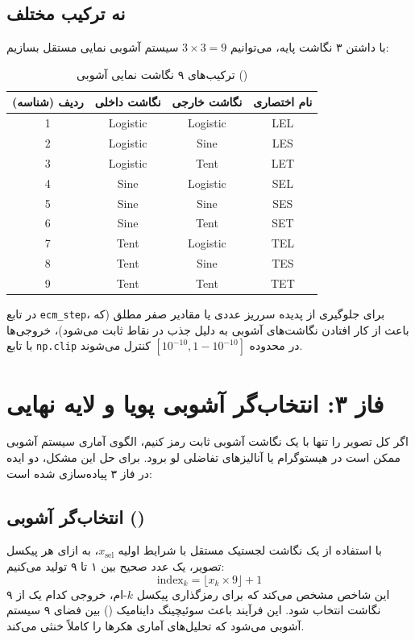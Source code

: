 \subsection{نه ترکیب مختلف}
با داشتن ۳ نگاشت پایه، می‌توانیم $3 \times 3 = 9$ سیستم آشوبی نمایی مستقل بسازیم:
\begin{table}[h!]
\centering
\begin{latin}
\begin{tabular}{|c|c|c|c|}
\hline
\textbf{ردیف (شناسه)} & \textbf{نگاشت داخلی} & \textbf{نگاشت خارجی} & \textbf{نام اختصاری} \\ \hline
1 & Logistic & Logistic & LEL \\ \hline
2 & Logistic & Sine & LES \\ \hline
3 & Logistic & Tent & LET \\ \hline
4 & Sine & Logistic & SEL \\ \hline
5 & Sine & Sine & SES \\ \hline
6 & Sine & Tent & SET \\ \hline
7 & Tent & Logistic & TEL \\ \hline
8 & Tent & Sine & TES \\ \hline
9 & Tent & Tent & TET \\ \hline
\end{tabular}
\end{latin}
\caption{ترکیب‌های ۹ نگاشت نمایی آشوبی ()}
\end{table}

در تابع \texttt{ecm\_step}، برای جلوگیری از پدیده سرریز عددی یا مقادیر صفر مطلق (که باعث از کار افتادن نگاشت‌های آشوبی به دلیل جذب در نقاط ثابت می‌شود)، خروجی‌ها با تابع \texttt{np.clip} در محدوده $[10^{-10}, 1 - 10^{-10}]$ کنترل می‌شوند.

\section{فاز ۳: انتخاب‌گر آشوبی پویا و لایه  نهایی}
اگر کل تصویر را تنها با یک نگاشت آشوبی ثابت رمز کنیم، الگوی آماری سیستم آشوبی ممکن است در هیستوگرام یا آنالیزهای تفاضلی لو برود. برای حل این مشکل، دو ایده در فاز ۳ پیاده‌سازی شده است:

\subsection{انتخاب‌گر آشوبی ()}
با استفاده از یک نگاشت لجستیک مستقل با شرایط اولیه $x_{\mathrm{sel}}$، به ازای هر پیکسل تصویر، یک عدد صحیح بین ۱ تا ۹ تولید می‌کنیم:
\begin{equation}
\mathrm{index}_k = \lfloor x_k \times 9 \rfloor + 1
\end{equation}
این شاخص مشخص می‌کند که برای رمزگذاری پیکسل $k$-ام، خروجی کدام یک از ۹ نگاشت  انتخاب شود. این فرآیند باعث سوئیچینگ داینامیک () بین فضای ۹ سیستم آشوبی می‌شود که تحلیل‌های آماری هکرها را کاملاً خنثی می‌کند.

